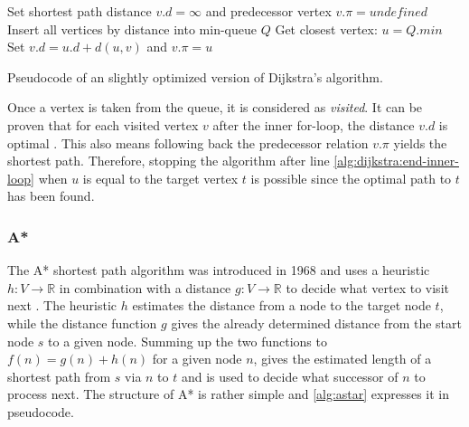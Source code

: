 			\begin{algorithm}[h]
				\begin{algorithmic}[1]
						\State Set shortest path distance $v.d = \infty$ and predecessor vertex $v.\pi = undefined$
					\EndFor
					\State Insert all vertices by distance into min-queue $Q$
					\State
						\State Get closest vertex: $u = Q.min$
								\State Set $v.d = u.d + d(u, v)$ and $v.\pi = u$
							\EndIf
						\EndFor \label{alg:dijkstra:end-inner-loop}
					\EndWhile
				\end{algorithmic}
				\caption{Pseudocode of an slightly optimized version of Dijkstra's algorithm.}
				\label{alg:dijkstra}
			\end{algorithm}
		
			Once a vertex is taken from the queue, it is considered as \emph{visited}.
			It can be proven that for each visited vertex $v$ after the inner for-loop, the distance $v.d$ is optimal \cite[659-661]{cormen-introduction-to-alg}.
			This also means following back the predecessor relation $v.\pi$ yields the shortest path.
			Therefore, stopping the algorithm after line \ref{alg:dijkstra:end-inner-loop} when $u$ is equal to the target vertex $t$ is possible since the optimal path to $t$ has been found.
		
		\subsubsection{A*}
		\label{subsubsec:astar}
		
			The A* shortest path algorithm was introduced in 1968 and uses a heuristic $h : V \rightarrow \mathbb{R}$ in combination with a distance $g : V \rightarrow \mathbb{R}$ to decide what vertex to visit next \cite{astar}.
			The heuristic $h$ estimates the distance from a node to the target node $t$, while the distance function $g$ gives the already determined distance from the start node $s$ to a given node.
			Summing up the two functions to $f(n) = g(n) + h(n)$ for a given node $n$, gives the estimated length of a shortest path from $s$ via $n$ to $t$ and is used to decide what successor of $n$ to process next.
			The structure of A* is rather simple and \cref{alg:astar} expresses it in pseudocode.
			
